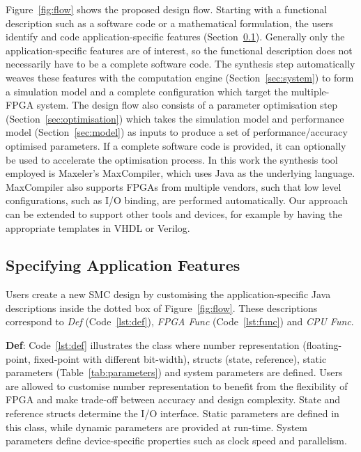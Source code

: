 Figure~\ref{fig:flow} shows the proposed design flow.
Starting with a functional description such as a software code or a mathematical formulation, the users identify and code application-specific features (Section~\ref{sec:kernel}). 
Generally only the application-specific features are of interest, so the functional description does not necessarily have to be a complete software code. 
The synthesis step automatically weaves these features with the computation engine (Section~\ref{sec:system}) to form a simulation model and a complete configuration which target the multiple-FPGA system.
The design flow also consists of a parameter optimisation step (Section~\ref{sec:optimisation}) which takes the simulation model and performance model (Section~\ref{sec:model}) as inputs to produce a set of performance/accuracy optimised parameters.
If a complete software code is provided, it can optionally be used to accelerate the optimisation process.
In this work the synthesis tool employed is Maxeler's MaxCompiler, which uses Java as the underlying language. 
MaxCompiler also supports FPGAs from multiple vendors, such that low level configurations, such as I/O binding, are performed automatically.
Our approach can be extended to support other tools and devices, for example by having the appropriate templates in VHDL or Verilog.

\subsection{Specifying Application Features}
\label{sec:kernel}

Users create a new SMC design by customising the application-specific Java descriptions inside the dotted box of Figure~\ref{fig:flow}.
These descriptions correspond to \textit{Def} (Code~\ref{lst:def}), \textit{FPGA Func} (Code~\ref{lst:func}) and \textit{CPU Func}.

\textbf{Def}: Code~\ref{lst:def} illustrates the class where number representation (floating-point, fixed-point with different bit-width), structs (state, reference), static parameters (Table~\ref{tab:parameters}) and system parameters are defined.
Users are allowed to customise number representation to benefit from the flexibility of FPGA and make trade-off between accuracy and design complexity.
State and reference structs determine the I/O interface.
Static parameters are defined in this class, while dynamic parameters are provided at run-time.
System parameters define device-specific properties such as clock speed and parallelism.

